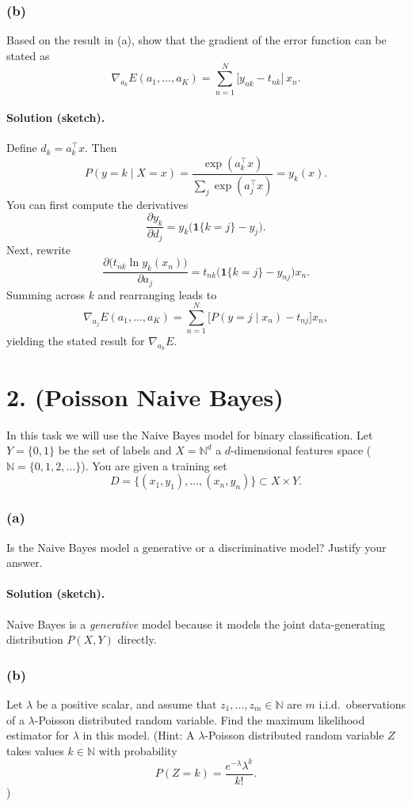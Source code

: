 \documentclass[twocolumn]{article}
\begin{document}
\begin{spacing}{1}
\subsubsection{(b)}
Based on the result in (a), show that the gradient of the error function can be stated as
\[
\nabla_{a_k} E(a_1, \dots, a_K) = \sum_{n=1}^N \bigl[y_{nk} - t_{nk}\bigr]\,x_n.
\]

\paragraph{Solution (sketch).}
Define $d_k = a_k^\top x$. Then
\[
P(y = k \mid X = x) = \frac{\exp(a_k^\top x)}{\sum_j \exp(a_j^\top x)} = y_k(x).
\]
You can first compute the derivatives
\[
\frac{\partial y_k}{\partial d_j} = y_k \bigl(\mathbf{1}\{k = j\} - y_j\bigr).
\]
Next, rewrite
\[
\frac{\partial \bigl(t_{nk} \ln y_k(x_n)\bigr)}{\partial a_j}
= t_{nk} \bigl(\mathbf{1}\{k = j\} - y_{nj}\bigr) x_n.
\]
Summing across $k$ and rearranging leads to
\[
\nabla_{a_j} E(a_1, \dots, a_K)
= \sum_{n=1}^N \bigl[P(y = j \mid x_n) - t_{nj}\bigr] x_n,
\]
yielding the stated result for $\nabla_{a_k} E$.

\bigskip

\section{2. (Poisson Naive Bayes)}
In this task we will use the Naive Bayes model for binary classification. Let $Y = \{0,1\}$ be the set of labels and $X = \mathbb{N}^d$ a $d$-dimensional features space ($\mathbb{N} = \{0,1,2,\dots\}$). You are given a training set
\[
D = \{(x_1,y_1), \dots, (x_n,y_n)\} \subset X \times Y.
\]

\subsubsection{(a)}
Is the Naive Bayes model a generative or a discriminative model? Justify your answer.

\paragraph{Solution (sketch).}
Naive Bayes is a \emph{generative} model because it models the joint data-generating distribution $P(X,Y)$ directly.

\subsubsection{(b)}
Let $\lambda$ be a positive scalar, and assume that $z_1,\dots,z_m \in \mathbb{N}$ are $m$ i.i.d.\ observations of a $\lambda$-Poisson distributed random variable. Find the maximum likelihood estimator for $\lambda$ in this model. (Hint: A $\lambda$-Poisson distributed random variable $Z$ takes values $k \in \mathbb{N}$ with probability
\[
P(Z = k) = \frac{e^{-\lambda} \lambda^k}{k!}.
\])


\end{spacing}
\end{document}
